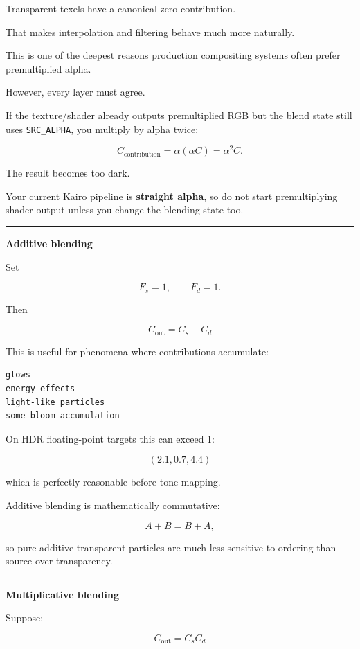 Transparent texels have a canonical zero contribution.

That makes interpolation and filtering behave much more naturally.

This is one of the deepest reasons production compositing systems often prefer premultiplied alpha.

However, every layer must agree.

If the texture/shader already outputs premultiplied RGB but the blend state still uses \texttt{SRC\_ALPHA}, you multiply by alpha twice:

\[
C_{\text{contribution}}
=
\alpha(\alpha C)
=
\alpha^2C.
\]

The result becomes too dark.

Your current Kairo pipeline is \textbf{straight alpha}, so do not start premultiplying shader output unless you change the blending state too.

\begin{center}\rule{0.5\linewidth}{0.5pt}\end{center}

\textbf{Additive blending}

Set

\[
F_s=1,\qquad F_d=1.
\]

Then

\[
\boxed{
C_{\text{out}}=C_s+C_d
}
\]

This is useful for phenomena where contributions accumulate:

\begin{verbatim}
glows
energy effects
light-like particles
some bloom accumulation
\end{verbatim}

On HDR floating-point targets this can exceed 1:

\[
(2.1,0.7,4.4)
\]

which is perfectly reasonable before tone mapping.

Additive blending is mathematically commutative:

\[
A+B=B+A,
\]

so pure additive transparent particles are much less sensitive to ordering than source-over transparency.

\begin{center}\rule{0.5\linewidth}{0.5pt}\end{center}

\textbf{Multiplicative blending}

Suppose:

\[
C_{\text{out}}=C_sC_d
\]

